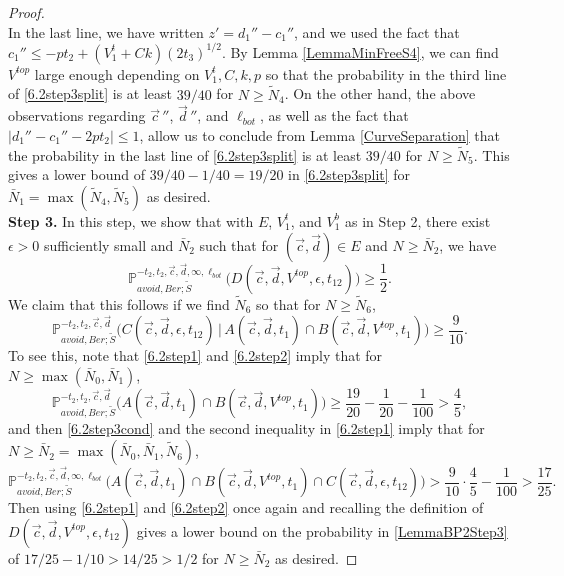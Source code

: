 \begin{proof}
\begin{equation}
	\end{equation}
	In the last line, we have written $z' = d_1'' - c_1''$, and we used the fact that $c_1'' \leq -pt_2 + (V_1^t + Ck)(2t_3)^{1/2}$. By Lemma \ref{LemmaMinFreeS4}, we can find $V^{top}$ large enough depending on $V_1^t,C,k,p$ so that the probability in the third line of \eqref{6.2step3split} is at least $39/40$ for $N\geq\tilde{N}_4$. On the other hand, the above observations regarding $\vec{c}\,''$, $\vec{d}\,''$, and $\ell_{bot}$, as well as the fact that $|d_1'' - c_1'' - 2pt_2| \leq 1$, allow us to conclude from Lemma \ref{CurveSeparation} that the probability in the last line of \eqref{6.2step3split} is at least $39/40$ for $N\geq\tilde{N}_5$. This gives a lower bound of $39/40 - 1/40 = 19/20$ in \eqref{6.2step3split} for $\bar{N}_1 = \max(\tilde{N}_4,\tilde{N}_5)$ as desired.\\
	
	{\bf \raggedleft Step 3.} In this step, we show that with $E$, $V_1^t$, and $V_1^b$ as in Step 2, there exist $\epsilon > 0$ sufficiently small and $\bar{N}_2$ such that for $(\vec{c}, \vec{d}) \in E$ and $N\geq\bar{N}_2$, we have
	\begin{equation}\label{LemmaBP2Step3}
	\mathbb{P}^{-t_2,t_2,\vec{c},\vec{d},\infty,\ell_{bot}}_{avoid,Ber;\tilde S}\big(D(\vec{c},\vec{d},V^{top},\epsilon,t_{12}) \big) \geq \frac{1}{2}.
	\end{equation}
	We claim that this follows if we find $\tilde{N}_6$ so that for $N\geq\tilde{N}_6$,
	\begin{equation}\label{6.2step3cond}
	\mathbb{P}^{-t_2,t_2,\vec{c},\vec{d}}_{avoid,Ber;\tilde S}\big(C(\vec{c},\vec{d},\epsilon,t_{12})\,|\,A(\vec{c},\vec{d},t_1) \cap B(\vec{c},\vec{d},V^{top},t_1)\big) \geq \frac{9}{10}.
	\end{equation}
	To see this, note that \eqref{6.2step1} and \eqref{6.2step2} imply that for $N\geq\max(\bar{N}_0,\bar{N}_1)$,
	\[
	\mathbb{P}^{-t_2,t_2,\vec{c},\vec{d}}_{avoid,Ber;\tilde S}\big(A(\vec{c},\vec{d},t_1) \cap B(\vec{c},\vec{d},V^{top},t_1)\big) \geq \frac{19}{20} - \frac{1}{20} - \frac{1}{100} > \frac{4}{5},
	\]
	and then \eqref{6.2step3cond} and the second inequality in \eqref{6.2step1} imply that for $N\geq \bar{N}_2 = \max(\bar{N}_0,\bar{N}_1,\tilde{N}_6)$,
	\[
	\mathbb{P}^{-t_2,t_2,\vec{c},\vec{d},\infty,\ell_{bot}}_{avoid,Ber;\tilde S}\big(A(\vec{c},\vec{d},t_1) \cap B(\vec{c},\vec{d},V^{top},t_1) \cap C(\vec{c},\vec{d},\epsilon,t_{12})\big) > \frac{9}{10}\cdot\frac{4}{5} - \frac{1}{100} > \frac{17}{25}.
	\]
	Then using \eqref{6.2step1} and \eqref{6.2step2} once again and recalling the definition of $D(\vec{c},\vec{d},V^{top},\epsilon,t_{12}) $ gives a lower bound on the probability in \eqref{LemmaBP2Step3} of $17/25 - 1/10 > 14/25 > 1/2$ for $N\geq\bar{N}_2$ as desired. 
	

\end{proof}
